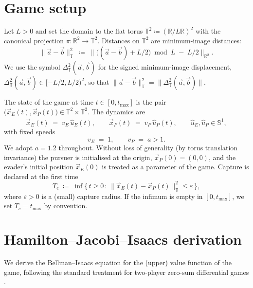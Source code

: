 \documentclass[11pt]{article}
\newcommand{\xE}{\vec{x}_E}
\newcommand{\xP}{\vec{x}_P}
\newcommand{\uE}{\hat{u}_E}
\newcommand{\uP}{\hat{u}_P}
\newcommand{\TT}{\mathbb{T}^{2}}
\newcommand{\RR}{\mathbb{R}}
\begin{document}
\section{Game setup}
\label{sec:setup}
Let $L>0$ and set the domain to the flat torus
$\TT \coloneqq (\RR/L\RR)^2$ with the canonical projection
$\pi:\RR^2\to\TT$.  Distances on $\TT$ are minimum-image distances:
\begin{equation}
\|\vec{a} - \vec{b}\|_\TT
  \;\coloneqq\;
  \big\| \big((\vec{a}-\vec{b}) + L/2\big) \bmod L \;-\; L/2 \big\|_{\RR^2}.
\end{equation}
We use the symbol $\Delta_\TT(\vec{a},\vec{b})$ for the signed
minimum-image displacement,
$\Delta_\TT(\vec{a},\vec{b}) \in [-L/2,L/2)^2$, so that
$\|\vec{a}-\vec{b}\|_\TT = \|\Delta_\TT(\vec{a},\vec{b})\|$.

\smallskip

The state of the game at time $t\in[0,t_{\max}]$ is the pair
$\big(\xE(t),\xP(t)\big)\in\TT\times\TT$.  The dynamics are
\begin{equation}
\label{eq:dyn}
\dot{\xE}(t) \;=\; v_E\,\uE(t), \qquad
\dot{\xP}(t) \;=\; v_P\,\uP(t),
\qquad \uE,\uP\in\mathbb{S}^{1},
\end{equation}
with fixed speeds
\begin{equation}
v_E \;=\; 1, \qquad v_P \;=\; a > 1.
\end{equation}
We adopt $a=1.2$ throughout.  Without loss of generality (by torus
translation invariance) the pursuer is initialised at the origin,
$\xP(0)=(0,0)$, and the evader's initial position $\xE(0)$ is treated
as a parameter of the game.  Capture is declared at the first time
\begin{equation}
T_c \;\coloneqq\; \inf\big\{\, t\ge 0 \,:\,
                  \|\xE(t)-\xP(t)\|_\TT \le \varepsilon \,\big\},
\end{equation}
where $\varepsilon>0$ is a (small) capture radius.  If the infimum is
empty in $[0,t_{\max}]$, we set $T_c = t_{\max}$ by convention.

\section{Hamilton--Jacobi--Isaacs derivation}
\label{sec:hji}
We derive the Bellman--Isaacs equation for the (upper) value
function of the game, following the standard treatment for two-player
zero-sum differential games \citep{Isaacs1965, basar1999dynamic,
elliotkalton1972}.
\end{document}
